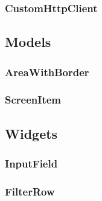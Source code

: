 \subsubsection{CustomHttpClient}

\subsection{Models}

\subsubsection{AreaWithBorder}

\subsubsection{ScreenItem}

\subsection{Widgets}

\subsubsection{InputField}
\label{fig:InputField} 


\subsubsection{FilterRow}
\label{fig:FilterRow}